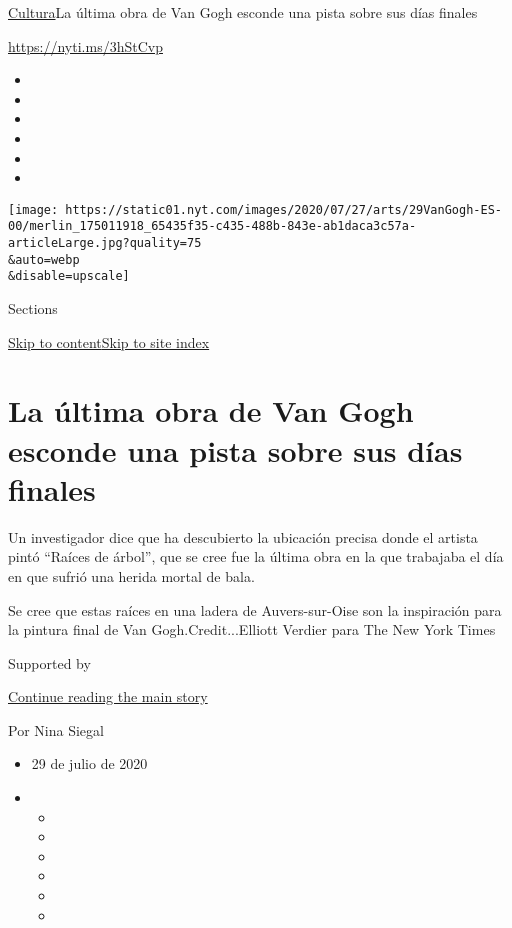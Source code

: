 \href{/es/section/cultura}{Cultura}\textbar{}La última obra de Van Gogh
esconde una pista sobre sus días finales

\url{https://nyti.ms/3hStCvp}

\begin{itemize}
\item
\item
\item
\item
\item
\item
\end{itemize}

\texttt{[image: https://static01.nyt.com/images/2020/07/27/arts/29VanGogh-ES-00/merlin\_175011918\_65435f35-c435-488b-843e-ab1daca3c57a-articleLarge.jpg?quality=75\\\&auto=webp\\\&disable=upscale]}

Sections

\protect\hyperlink{site-content}{Skip to
content}\protect\hyperlink{site-index}{Skip to site index}

\hypertarget{la-uxfaltima-obra-de-van-gogh-esconde-una-pista-sobre-sus-duxedas-finales}{%
\section{La última obra de Van Gogh esconde una pista sobre sus días
finales}\label{la-uxfaltima-obra-de-van-gogh-esconde-una-pista-sobre-sus-duxedas-finales}}

Un investigador dice que ha descubierto la ubicación precisa donde el
artista pintó ``Raíces de árbol'', que se cree fue la última obra en la
que trabajaba el día en que sufrió una herida mortal de bala.

Se cree que estas raíces en una ladera de Auvers-sur-Oise son la
inspiración para la pintura final de Van Gogh.Credit...Elliott Verdier
para The New York Times

Supported by

\protect\hyperlink{after-sponsor}{Continue reading the main story}

Por Nina Siegal

\begin{itemize}
\item
  29 de julio de 2020
\item
  \begin{itemize}
  \item
  \item
  \item
  \item
  \item
  \item
  \end{itemize}
\end{itemize}

